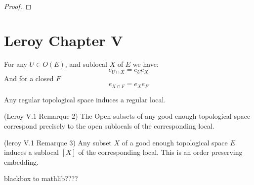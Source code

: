\begin{proof}
    \leanok
\end{proof}





\section{Leroy Chapter V}\label{sec:leroy-chapter-v}


\begin{lemma}
    \label{lem:open_closed_intersection}
    For any $U \in O(E)$, and sublocal $X$ of $E$ we have:
    \[e_{U \cap X} = e_Ue_X\]
    And for a closed $F$
    \[e_{X \cap F} = e_Xe_F\]
\end{lemma}

\begin{lemma}
    \label{lem:regular_top_to_regular_local}
    Any regular topological space induces a regular local.
\end{lemma}

\begin{lemma}[Opens]
(Leroy V.1 Remarque 2)
    \label{lem:opens_correspond}
    The Open subsets of any good enough topological space correspond precisely to the open sublocals of the corresponding local.
\end{lemma}

\begin{lemma}
(leroy V.1 Remarque 3)
    \label{lem:subset_sublocal}
    Any subset $X$ of a good enough topological space $E$ induces a sublocal $[X]$ of the corresponding local. This is an order preserving embedding.
\end{lemma}

\begin{definition}
    \label{def:good_enough_topological_space}
    blackbox to mathlib???? 
\end{definition}

